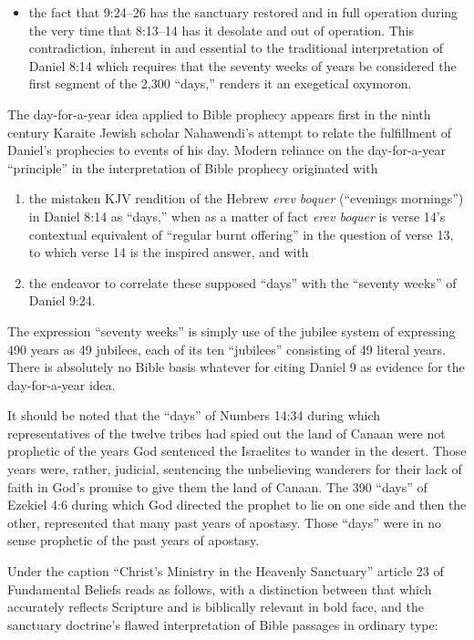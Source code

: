\begin{itemize}
	\item the fact that 9:24--26 has the sanctuary restored and in full operation
during the very time that 8:13--14 has it desolate and out of operation. This
contradiction, inherent in and essential to the traditional interpretation
of Daniel 8:14 which requires that the seventy weeks of years be considered
the first segment of the 2,300 ``days,'' renders it an exegetical oxymoron.
\end{itemize}

The day-for-a-year idea applied to Bible prophecy appears first in the ninth
century Karaite Jewish scholar Nahawendi's attempt to relate the fulfillment
of Daniel's prophecies to events of his day. Modern reliance on the
day-for-a-year ``principle'' in the interpretation of Bible prophecy
originated with
\begin{enumerate}
	\item the mistaken KJV rendition of the Hebrew \textit{erev boquer}
(``evenings mornings'') in Daniel 8:14 as ``days,'' when as a matter of fact 
\textit{erev boquer} is verse 14's contextual equivalent of ``regular burnt offering''
in the question of verse 13, to which verse 14 is the inspired answer, and
with 
	\item the endeavor to correlate these supposed ``days'' with the ``seventy
weeks'' of Daniel 9:24.
\end{enumerate}
The expression ``seventy weeks'' is simply use of the
jubilee system of expressing 490 years as 49 jubilees, each of its ten
``jubilees'' consisting of 49 literal years. There is absolutely no Bible
basis whatever for citing Daniel 9 as evidence for the day-for-a-year idea.

It should be noted that the ``days'' of Numbers 14:34 during which
representatives of the twelve tribes had spied out the land of Canaan were
not prophetic of the years God sentenced the Israelites to wander in the
desert. Those years were, rather, judicial, sentencing the unbelieving
wanderers for their lack of faith in God's promise to give them the land of
Canaan. The 390 ``days'' of Ezekiel 4:6 during which God directed the prophet
to lie on one side and then the other, represented that many past years of
apostasy. Those ``days'' were in no sense prophetic of the past years of
apostasy.

Under the caption ``Christ's Ministry in the Heavenly Sanctuary'' article 23
of Fundamental Beliefs reads as follows, with a distinction between that
which accurately reflects Scripture and is biblically relevant in bold face,
and the sanctuary doctrine's flawed interpretation of Bible passages in
ordinary type:

